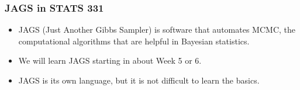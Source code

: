 \documentclass{beamer}
\begin{document}
\begin{frame}
\frametitle{JAGS in STATS 331}
\begin{itemize}
\item JAGS (Just Another Gibbs Sampler) is software that automates MCMC, the
computational algorithms that are helpful in Bayesian statistics.\pause \\[0.5em]
\item We will learn JAGS starting in about Week 5 or 6.\pause \\[0.5em]
\item JAGS is its own language, but it is not difficult to learn the basics.
\end{itemize}


\end{frame}
\end{document}
